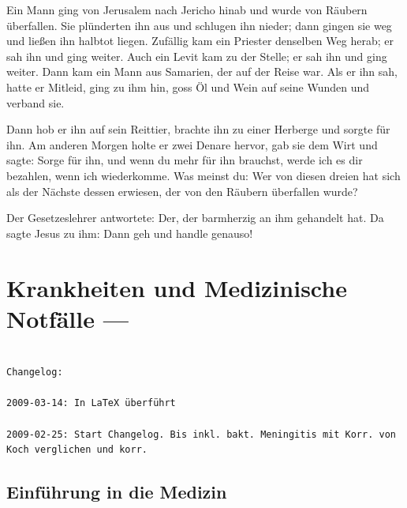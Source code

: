 \begin{savequote}
Ein Mann ging von Jerusalem nach Jericho hinab und wurde von Räubern überfallen. 
Sie plünderten ihn aus und schlugen ihn nieder; dann gingen sie weg und ließen ihn 
halbtot liegen. Zufällig kam ein Priester denselben Weg
herab; er sah ihn und ging weiter. Auch ein Levit kam zu
der  Stelle; er sah ihn und ging weiter. Dann kam ein Mann
aus  Samarien, der auf der Reise war. Als er ihn sah, hatte
er  Mitleid, ging zu ihm hin, goss Öl und Wein auf seine
Wunden  und verband sie. 

Dann hob er ihn auf sein Reittier,
brachte  ihn zu einer Herberge und sorgte für ihn. Am
anderen Morgen  holte er zwei Denare hervor, gab sie dem
Wirt und sagte:  Sorge für ihn, und wenn du mehr für ihn
brauchst, werde  ich es dir bezahlen, wenn ich wiederkomme.
Was meinst du:  Wer von diesen dreien hat sich als der
Nächste dessen erwiesen,  der von den Räubern überfallen
wurde?  

Der Gesetzeslehrer antwortete: Der, der barmherzig
an  ihm gehandelt hat. Da sagte Jesus zu ihm: Dann geh und handle genauso!
\end{savequote}

\chapter{Krankheiten und Medizinische Notfälle --- }



\minitoc

\author{Sebastian Gabriel, Michael Withofner}

\begin{verbatim}

Changelog:

2009-03-14: In LaTeX überführt

2009-02-25: Start Changelog. Bis inkl. bakt. Meningitis mit Korr. von
Koch verglichen und korr.
\end{verbatim}


\section{Einführung in die Medizin}


% 

